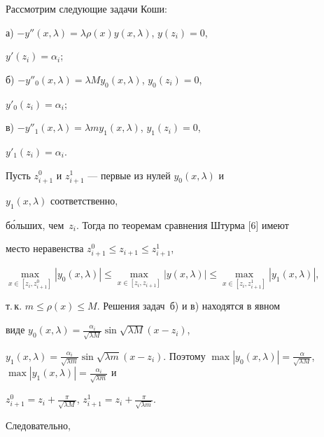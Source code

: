 \begin{pf} 


Рассмотрим следующие задачи Коши: 


 


а) $-y''(x,\lambda)=\lambda\rho(x)y(x,\lambda)$, $y(z_i)=0$, 


$y'(z_i)=\alpha_i$; 


 


б) $-y''_0(x,\lambda)=\lambda M y_0(x,\lambda)$, $y_0(z_i)=0$, 


$y'_0(z_i)=\alpha_i$; 


 


в) $-y''_1(x,\lambda)=\lambda m y_1(x,\lambda)$, $y_1(z_i)=0$, 


$y'_1(z_i)=\alpha_i$. 


 


Пусть $z^0_{i+1}$ и $z^1_{i+1}$ --- первые из нулей $y_0(x,\lambda)$ и 


$y_1(x,\lambda)$ соответственно, 


б\'ольших, чем~$z_i$. Тогда по теоремам сравнения Штурма [6] имеют 


место неравенства $z^0_{i+1}\le z_{i+1}\le z^1_{i+1}$, 


$\max\limits_{x\in[z_i,z^0_{i+1}]}|y_0(x,\lambda)|\le 


\max\limits_{x\in[z_i,z_{i+1}]}|y(x,\lambda)|\le 


\max\limits_{x\in[z_i,z^1_{i+1}]}|y_1(x,\lambda)|$, 


т.\,к. $m\le\rho(x)\le M$. Решения задач~б) и в) находятся в явном 


виде $y_0(x,\lambda)=\frac{\alpha_i}{\sqrt{\lambda M}} 


\sin\sqrt{\lambda M}(x-z_i)$, 


$y_1(x,\lambda)=\frac{\alpha_i}{\sqrt{\lambda m}} \sin\sqrt{\lambda 


m}(x-z_i)$. Поэтому $\max|y_0(x,\lambda)|=\frac{\alpha}{\sqrt{\lambda 


M}}$, $\max|y_1(x,\lambda)|=\frac{\alpha_i}{\sqrt{\lambda m}}$ и 


$z^0_{i+1}=z_i+\frac{\pi}{\sqrt{\lambda M}}$, $z^1_{i+1}= 


z_i+\frac{\pi}{\sqrt{\lambda m}}$. 


Следовательно,


\begin{equation} 



\end{equation}
\end{pf}

